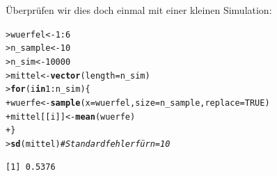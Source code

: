\documentclass[oneside, 10pt]{book}\usepackage[]{graphicx}\usepackage[]{xcolor}
\makeatletter
\newcommand{\hlnum}[1]{\textcolor[rgb]{0.686,0.059,0.569}{#1}}%
\newcommand{\hlcom}[1]{\textcolor[rgb]{0.678,0.584,0.686}{\textit{#1}}}%
\newcommand{\hlopt}[1]{\textcolor[rgb]{0,0,0}{#1}}%
\newcommand{\hlstd}[1]{\textcolor[rgb]{0.345,0.345,0.345}{#1}}%
\newcommand{\hlkwa}[1]{\textcolor[rgb]{0.161,0.373,0.58}{\textbf{#1}}}%
\newcommand{\hlkwb}[1]{\textcolor[rgb]{0.69,0.353,0.396}{#1}}%
\newcommand{\hlkwc}[1]{\textcolor[rgb]{0.333,0.667,0.333}{#1}}%
\newcommand{\hlkwd}[1]{\textcolor[rgb]{0.737,0.353,0.396}{\textbf{#1}}}%
\newenvironment{kframe}{%
 \def\at@end@of@kframe{}%
 \ifinner\ifhmode%
  \def\at@end@of@kframe{\end{minipage}}%
  \begin{minipage}{\columnwidth}%
 \fi\fi%
 \def\FrameCommand##1{\hskip\@totalleftmargin \hskip-\fboxsep
 \colorbox{shadecolor}{##1}\hskip-\fboxsep
     \hskip-\linewidth \hskip-\@totalleftmargin \hskip\columnwidth}%
 \MakeFramed {\advance\hsize-\width
   \@totalleftmargin\z@ \linewidth\hsize
   \@setminipage}}%
 {\par\unskip\endMakeFramed%
 \at@end@of@kframe}
\newenvironment{knitrout}{}{} %
\makeatother
\begin{document}
Überprüfen wir dies doch einmal mit einer kleinen Simulation:
\begin{knitrout}
\color{fgcolor}\begin{kframe}
\begin{alltt}
\hlstd{> }\hlstd{wuerfel} \hlkwb{<-} \hlnum{1}\hlopt{:}\hlnum{6}
\hlstd{> }\hlstd{n_sample} \hlkwb{<-} \hlnum{10}
\hlstd{> }\hlstd{n_sim} \hlkwb{<-} \hlnum{10000}
\hlstd{> }\hlstd{mittel} \hlkwb{<-} \hlkwd{vector}\hlstd{(}\hlkwc{length} \hlstd{= n_sim)}
\hlstd{> }\hlkwa{for} \hlstd{(i} \hlkwa{in} \hlnum{1}\hlopt{:}\hlstd{n_sim) \{}
\hlstd{+ }  \hlstd{wuerfe} \hlkwb{<-} \hlkwd{sample}\hlstd{(}\hlkwc{x} \hlstd{= wuerfel,} \hlkwc{size} \hlstd{= n_sample,} \hlkwc{replace} \hlstd{=} \hlnum{TRUE}\hlstd{)}
\hlstd{+ }  \hlstd{mittel[[i]]} \hlkwb{<-} \hlkwd{mean}\hlstd{(wuerfe)}
\hlstd{+ }\hlstd{\}}
\hlstd{> }\hlkwd{sd}\hlstd{(mittel)} \hlcom{# Standardfehler für n = 10}
\end{alltt}
\begin{verbatim}
[1] 0.5376
\end{verbatim}
\end{kframe}
\end{knitrout}
\end{document}
